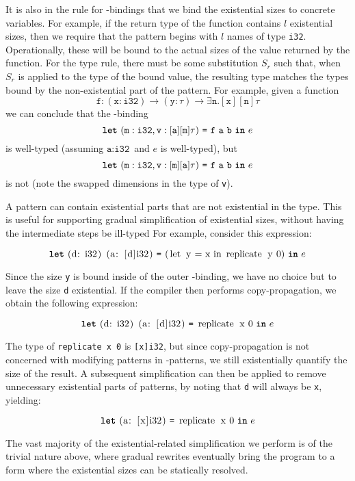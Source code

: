 It is also in the rule for -bindings that we bind the
existential sizes to concrete variables.  For example, if the return
type of the function contains $l$ existential sizes, then we require
that the pattern begins with $l$ names of type \texttt{i32}.
Operationally, these will be bound to the actual sizes of the value
returned by the function.  For the type rule, there must be some
substitution $S_{r}$ such that, when $S_{r}$ is applied to the type of
the bound value, the resulting type matches the types bound by the
non-existential part of the pattern.  For example, given a function
\[
  \texttt{f}: (\texttt{x}: \texttt{i32}) \rightarrow (\texttt{y}: \tau) \rightarrow \exists \texttt{n}.[\texttt{x}][\texttt{n}]\tau
\]
we can conclude that the -binding
\[
\mbox{\texttt{\bfseries{let}}}~(\texttt{m}: \texttt{i32}, \texttt{v}: [\texttt{a}][\texttt{m}]\tau)~\mbox{\texttt{=}}~\texttt{f}~\texttt{a}~\texttt{b}~\mbox{\texttt{\bfseries{in}}}~e
\]
is well-typed (assuming $\texttt{a}: \texttt{i32}$ and $e$ is
well-typed), but
\[
\mbox{\texttt{\bfseries{let}}}~(\texttt{m}: \texttt{i32}, \texttt{v}: [\texttt{m}][\texttt{a}]\tau)~\mbox{\texttt{=}}~\texttt{f}~\texttt{a}~\texttt{b}~\mbox{\texttt{\bfseries{in}}}~e
\]
is not (note the swapped dimensions in the type of \texttt{v}).

A pattern can contain existential parts that are not existential in
the type.  This is useful for supporting gradual simplification of
existential sizes, without having the intermediate steps be ill-typed
For example, consider this expression:

\[
\Let{\mbox{\lstinline{(d: i32) (a: [d]i32)}}}{\mbox{\lstinline{(let y = x in replicate y 0)}}}{e}
\]

Since the size \texttt{y} is bound inside of the outer
-binding, we have no choice but to leave the size \texttt{d}
existential.  If the compiler then performs copy-propagation, we
obtain the following expression:

\[
\Let{\mbox{\lstinline{(d: i32) (a: [d]i32)}}}{\mbox{\lstinline{replicate x 0}}}{e}
\]

The type of \lstinline{replicate x 0} is \lstinline{[x]i32}, but since
copy-propagation is not concerned with modifying patterns in
-patterns, we still existentially quantify the size of the
result.  A subsequent simplification can then be applied to remove
unnecessary existential parts of patterns, by noting that \texttt{d}
will always be \texttt{x}, yielding:

\[
\Let{\mbox{\lstinline{(a: [x]i32)}}}{\mbox{\lstinline{replicate x 0}}}{e}
\]

The vast majority of the existential-related simplification we perform
is of the trivial nature above, where gradual rewrites eventually
bring the program to a form where the existential sizes can be
statically resolved.

